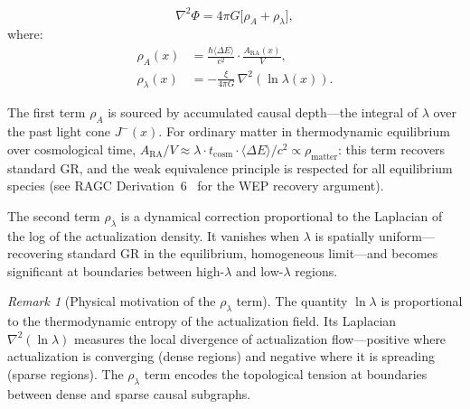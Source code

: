 \documentclass[11pt,a4paper]{article}
\theoremstyle{plain}
\theoremstyle{definition}
\theoremstyle{remark}
\newtheorem{remark}[theorem]{Remark}
\newcommand{\ARA}{A_{\mathrm{RA}}}
\begin{document}
\begin{equation}
  \nabla^2\Phi = 4\pi G\bigl[\rho_A + \rho_\lambda\bigr],
  \label{eq:unified}
\end{equation}
where:
\begin{align}
  \rho_A(x) &= \frac{\hbar\langle\Delta E\rangle}{c^2}
    \cdot \frac{\ARA(x)}{V}, \label{eq:rhoA} \\
  \rho_\lambda(x) &= -\frac{\xi}{4\pi G}\,\nabla^2(\ln\lambda(x)).
    \label{eq:rhoL}
\end{align}

The first term $\rho_A$ is sourced by accumulated causal depth---the integral of
$\lambda$ over the past light cone $J^-(x)$. For ordinary matter in thermodynamic
equilibrium over cosmological time, $\ARA/V \approx \lambda \cdot t_{\mathrm{cosm}}
\cdot \langle\Delta E\rangle/c^2 \propto \rho_{\mathrm{matter}}$: this term
recovers standard GR, and the weak equivalence principle is respected for all
equilibrium species (see RAGC Derivation~6~\citep{Sandeman2026b} for the
WEP recovery argument).

The second term $\rho_\lambda$ is a dynamical correction proportional to the
Laplacian of the log of the actualization density. It vanishes when $\lambda$ is
spatially uniform---recovering standard GR in the equilibrium, homogeneous
limit---and becomes significant at boundaries between high-$\lambda$ and
low-$\lambda$ regions.

\begin{remark}[Physical motivation of the $\rho_\lambda$ term]
The quantity $\ln\lambda$ is proportional to the thermodynamic entropy of the
actualization field. Its Laplacian $\nabla^2(\ln\lambda)$ measures the local
divergence of actualization flow---positive where actualization is converging
(dense regions) and negative where it is spreading (sparse regions). The
$\rho_\lambda$ term encodes the topological tension at boundaries between
dense and sparse causal subgraphs.
\end{remark}
\end{document}

